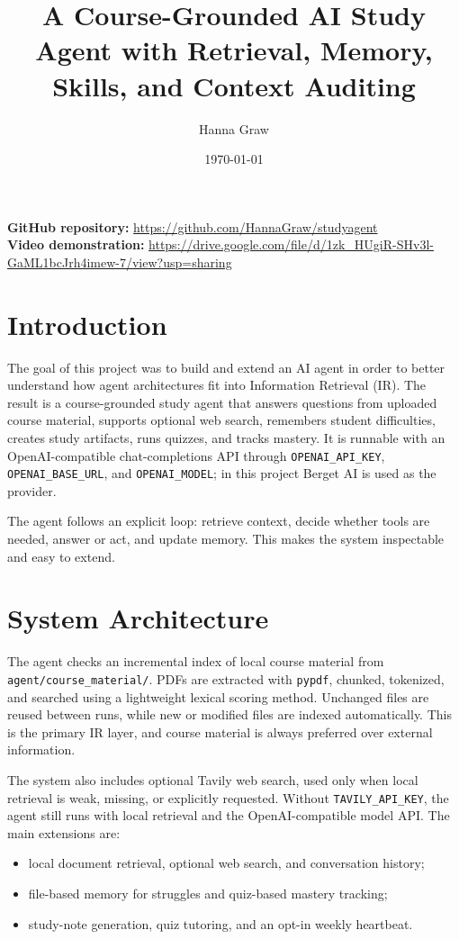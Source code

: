\documentclass[10pt,a4paper]{article}
\title{A Course-Grounded AI Study Agent with Retrieval, Memory, Skills, and Context Auditing}
\author{Hanna Graw}
\date{\today}
\begin{document}
\maketitle

\noindent
\textbf{GitHub repository:} \url{https://github.com/HannaGraw/studyagent} \\
\textbf{Video demonstration:} \url{https://drive.google.com/file/d/1zk_HUgiR-SHv3l-GaML1bcJrh4imew-7/view?usp=sharing}

\section{Introduction}

The goal of this project was to build and extend an AI agent in order to better understand how agent architectures fit into Information Retrieval (IR). The result is a course-grounded study agent that answers questions from uploaded course material, supports optional web search, remembers student difficulties, creates study artifacts, runs quizzes, and tracks mastery. It is runnable with an OpenAI-compatible chat-completions API through \texttt{OPENAI\_API\_KEY}, \texttt{OPENAI\_BASE\_URL}, and \texttt{OPENAI\_MODEL}; in this project Berget AI is used as the provider.

The agent follows an explicit loop: retrieve context, decide whether tools are needed, answer or act, and update memory. This makes the system inspectable and easy to extend.

\section{System Architecture}

The agent checks an incremental index of local course material from \texttt{agent/course\_material/}. PDFs are extracted with \texttt{pypdf}, chunked, tokenized, and searched using a lightweight lexical scoring method. Unchanged files are reused between runs, while new or modified files are indexed automatically. This is the primary IR layer, and course material is always preferred over external information.

The system also includes optional Tavily web search, used only when local retrieval is weak, missing, or explicitly requested. Without \texttt{TAVILY\_API\_KEY}, the agent still runs with local retrieval and the OpenAI-compatible model API. The main extensions are:

\begin{itemize}
    \item local document retrieval, optional web search, and conversation history;
    \item file-based memory for struggles and quiz-based mastery tracking;
    \item study-note generation, quiz tutoring, and an opt-in weekly heartbeat.
\end{itemize}
\end{document}
